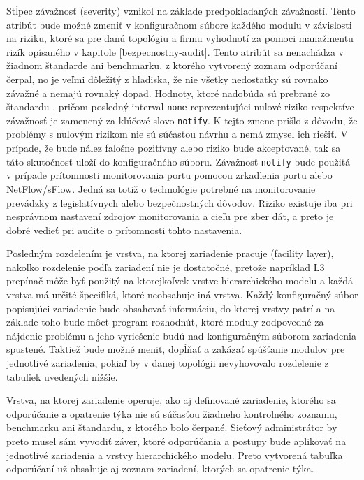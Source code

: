 Stĺpec závažnosť (severity) vznikol na základe predpokladaných závažností. Tento atribút bude možné zmeniť v konfiguračnom súbore každého modulu v závislosti na riziku, ktoré sa pre danú topológiu a firmu vyhodnotí za pomoci manažmentu rizík opísaného v kapitole \ref{bezpecnostny-audit}. Tento atribút sa nenachádza v žiadnom štandarde ani benchmarku, z ktorého vytvorený zoznam odporúčaní čerpal, no je veľmi dôležitý z hľadiska, že nie všetky nedostatky sú rovnako závažné a nemajú rovnaký dopad. Hodnoty, ktoré nadobúda sú prebrané zo štandardu , pričom posledný interval \texttt{none} reprezentujúci nulové riziko respektíve závažnosť je zamenený za kľúčové slovo \texttt{notify}. K tejto zmene prišlo z dôvodu, že problémy s nulovým rizikom nie sú súčasťou návrhu a nemá zmysel ich riešiť. V prípade, že bude nález falošne pozitívny alebo riziko bude akceptované, tak sa táto skutočnosť uloží do konfiguračného súboru. Závažnosť \texttt{notify} bude použitá v prípade prítomnosti monitorovania portu pomocou zrkadlenia portu alebo NetFlow/sFlow. Jedná sa totiž o technológie potrebné na monitorovanie prevádzky z legislatívnych alebo bezpečnostných dôvodov. Riziko existuje iba pri nesprávnom nastavení zdrojov monitorovania a cieľu pre zber dát, a preto je dobré vedieť pri audite o prítomnosti tohto nastavenia.
 

Posledným rozdelením je vrstva, na ktorej zariadenie pracuje (facility layer), nakoľko rozdelenie podľa zariadení nie je dostatočné, pretože napríklad L3 prepínač môže byť použitý na ktorejkoľvek vrstve hierarchického modelu a každá vrstva má určité špecifiká, ktoré neobsahuje iná vrstva. Každý konfiguračný súbor popisujúci zariadenie bude obsahovať informáciu, do ktorej vrstvy patrí a na základe toho bude môcť program rozhodnúť, ktoré moduly zodpovedné za nájdenie problému a jeho vyriešenie budú nad konfiguračným súborom zariadenia spustené. Taktiež bude možné meniť, dopĺňať a zakázať spúšťanie modulov pre jednotlivé zariadenia, pokiaľ by v danej topológii nevyhovovalo rozdelenie z tabuliek uvedených nižšie. 

Vrstva, na ktorej zariadenie operuje, ako aj definované zariadenie, ktorého sa odporúčanie a opatrenie týka nie sú súčasťou žiadneho kontrolného zoznamu, benchmarku ani štandardu, z ktorého bolo čerpané. Sieťový administrátor by preto musel sám vyvodiť záver, ktoré odporúčania a postupy bude aplikovať na jednotlivé zariadenia a vrstvy hierarchického modelu. Preto vytvorená tabuľka odporúčaní už obsahuje aj zoznam zariadení, ktorých sa opatrenie týka.


